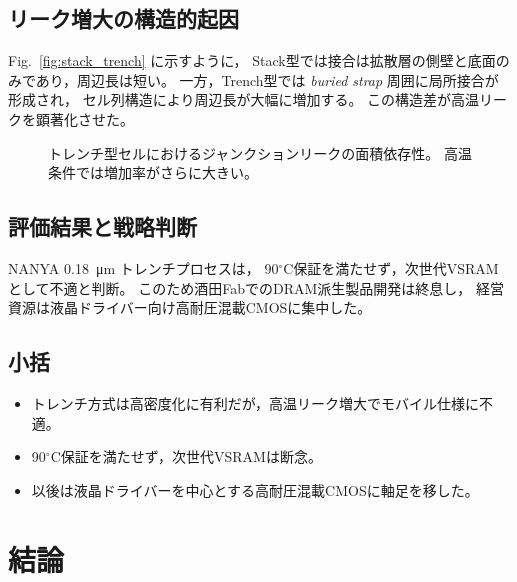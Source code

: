 \documentclass[conference]{IEEEtran}
\begin{document}
\subsection{リーク増大の構造的起因}
Fig.~\ref{fig:stack_trench} に示すように，
Stack型では接合は拡散層の側壁と底面のみであり，周辺長は短い。
一方，Trench型では \emph{buried strap} 周囲に局所接合が形成され，
セル列構造により周辺長が大幅に増加する。
この構造差が高温リークを顕著化させた。

\begin{figure}[t]
\centering
{}
\caption{トレンチ型セルにおけるジャンクションリークの面積依存性。
高温条件では増加率がさらに大きい。}
\label{fig:trench_leak}
\end{figure}

\subsection{評価結果と戦略判断}
NANYA \SI{0.18}{\micro\meter} トレンチプロセスは，
90$^\circ$C保証を満たせず，次世代VSRAMとして不適と判断。
このため酒田FabでのDRAM派生製品開発は終息し，
経営資源は液晶ドライバー向け高耐圧混載CMOSに集中した。

\subsection{小括}
\begin{itemize}
  \item トレンチ方式は高密度化に有利だが，高温リーク増大でモバイル仕様に不適。
  \item 90$^\circ$C保証を満たせず，次世代VSRAMは断念。
  \item 以後は液晶ドライバーを中心とする高耐圧混載CMOSに軸足を移した。
\end{itemize}

\section{結論}
\end{document}
